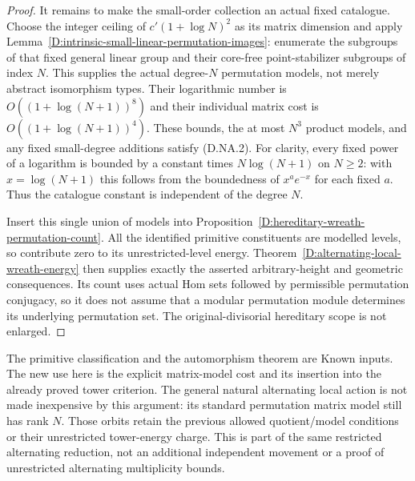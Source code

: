 \begin{proof}
It remains to make the small-order collection an actual
fixed catalogue. Choose the integer ceiling of
$c'(1+\log N)^2$ as its matrix dimension and apply
Lemma~\ref{D:intrinsic-small-linear-permutation-images}:
enumerate the subgroups of that fixed general linear
group and their core-free point-stabilizer subgroups
of index $N$. This supplies the actual degree-$N$
permutation models, not merely abstract isomorphism
types. Their logarithmic number is
$O((1+\log(N+1))^8)$ and their individual matrix
cost is $O((1+\log(N+1))^4)$.
These bounds, the at most $N^3$ product models, and
any fixed small-degree additions satisfy (D.NA.2).
For clarity, every fixed power of a logarithm is bounded
by a constant times $N\log(N+1)$ on $N\ge2$:
with $x=\log(N+1)$ this follows from the boundedness
of $x^a e^{-x}$ for each fixed $a$. Thus the catalogue
constant is independent of the degree $N$.

Insert this single union of models into
Proposition~\ref{D:hereditary-wreath-permutation-count}.
All the identified primitive constituents are modelled
levels, so contribute zero to its unrestricted-level
energy. Theorem~\ref{D:alternating-local-wreath-energy}
then supplies exactly the asserted arbitrary-height
and geometric consequences. Its count uses actual Hom
sets followed by permissible permutation conjugacy,
so it does not assume that a modular permutation module
determines its underlying permutation set.
The original-divisorial hereditary scope is not enlarged.
\end{proof}

\begin{remark}
The primitive classification and the automorphism theorem
are Known inputs. The new use here is the explicit
matrix-model cost and its insertion into the already
proved tower criterion. The general natural alternating
local action is not made inexpensive by this argument:
its standard permutation matrix model still has rank $N$.
Those orbits retain the previous allowed quotient/model
conditions or their unrestricted tower-energy charge.
This is part of the same restricted alternating reduction,
not an additional independent movement or a proof of
unrestricted alternating multiplicity bounds.
\end{remark}
